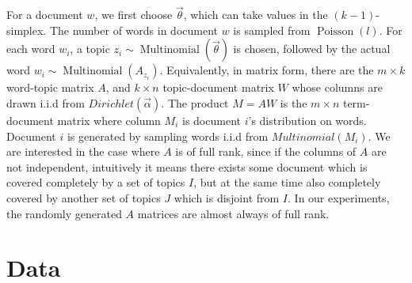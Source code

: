 \documentclass{sig-alternate}
\begin{document}
For a document $w$, we first choose $\vec{\theta}$, which can take values in the $(k-1)$-simplex.
The number of words in document $w$ is sampled from $\operatorname{Poisson}(l)$. For each word $w_i$, a
topic $z_i\sim \operatorname{Multinomial}(\vec{\theta})$ is chosen, followed by the actual
word $w_i\sim \operatorname{Multinomial}(A_{z_i})$. Equivalently, in
matrix form, there are the $m\times k$ word-topic matrix $A$, and
$k\times n$ topic-document matrix $W$ whose columns are drawn i.i.d
from $Dirichlet(\vec{\alpha})$. The product $M=AW$ is the $m\times n$
term-document matrix where column $M_i$ is document $i$'s distribution
on words. Document $i$ is generated by sampling words i.i.d from
$Multinomial(M_i)$. We are interested in the case where $A$ is of full
rank, since if the columns of $A$ are not independent, intuitively it
means there exists some document which is covered completely by a set
of topics $I$, but at the same time also completely covered by another
set of topics $J$ which is disjoint from $I$. In our experiments, the
randomly generated $A$ matrices are almost always of full rank.

\section{Data} \label{sec:data}
\end{document}
